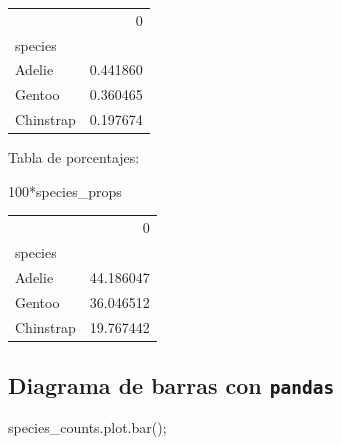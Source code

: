 \documentclass[
  a4paper,
  noprof,
  12pt,
  notoc,
  nosols,
  nobib]{mnye}
\newenvironment{Shaded}{\begin{snugshade}}{\end{snugshade}}
\newcommand{\DecValTok}[1]{\textcolor[rgb]{0.68,0.00,0.00}{#1}}
\newcommand{\NormalTok}[1]{\textcolor[rgb]{0.00,0.23,0.31}{#1}}
\newcommand{\OperatorTok}[1]{\textcolor[rgb]{0.37,0.37,0.37}{#1}}
\theoremstyle{definition}
\theoremstyle{remark}
\begin{document}
\begin{tabular}{lr}
\toprule
{} &         0 \\
species   &           \\
\midrule
Adelie    &  0.441860 \\
Gentoo    &  0.360465 \\
Chinstrap &  0.197674 \\
\bottomrule
\end{tabular}

Tabla de porcentajes:

\begin{Shaded}
\begin{Highlighting}[]
\DecValTok{100}\OperatorTok{*}\NormalTok{species\_props}
\end{Highlighting}
\end{Shaded}

\begin{tabular}{lr}
\toprule
{} &          0 \\
species   &            \\
\midrule
Adelie    &  44.186047 \\
Gentoo    &  36.046512 \\
Chinstrap &  19.767442 \\
\bottomrule
\end{tabular}

\hypertarget{diagrama-de-barras-con-pandas}{%
\subsection{\texorpdfstring{Diagrama de barras con
\texttt{pandas}}{Diagrama de barras con pandas}}\label{diagrama-de-barras-con-pandas}}

\begin{Shaded}
\begin{Highlighting}[]
\NormalTok{species\_counts.plot.bar()}\OperatorTok{;}
\end{Highlighting}
\end{Shaded}
\end{document}
